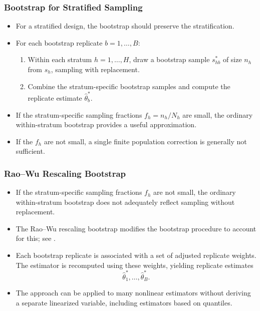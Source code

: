 \documentclass{my_eth_beamer}
\numberwithin{equation}{section}
\begin{document}
\begin{frame}
    \frametitle{\normalsize{Bootstrap for Stratified Sampling}}
    \begin{itemize}
    \setlength{\itemsep}{8pt}
        \item For a stratified design, the bootstrap should
            \alert{preserve the stratification}.
        \item For each bootstrap replicate $b=1,\ldots,B$:
            \vspace{0.25em}
            \begin{enumerate}
            \setlength{\itemsep}{5pt}
                \item Within each stratum $h = 1, \ldots, H$, draw a bootstrap
                    sample $s_{hb}^*$ of size $n_h$ from $s_h$, sampling
                    \alert{with replacement}.
                \item Combine the stratum-specific bootstrap samples and
                    compute the replicate estimate $\widehat{\theta}_b^*$.
            \end{enumerate}
        \item If the stratum-specific sampling fractions $f_h = n_h / N_h$
            are small, the ordinary within-stratum bootstrap provides a
            useful approximation.
        \item If the $f_h$ are not small, a single finite population
            correction is generally \alert{not sufficient}.
    \end{itemize}
\end{frame}

\begin{frame}
    \frametitle{\normalsize{Rao--Wu Rescaling Bootstrap}}
    \begin{itemize}
    \setlength{\itemsep}{8pt}
        \item If the stratum-specific sampling fractions $f_h$ are not small,
            the ordinary within-stratum bootstrap does not adequately reflect
            sampling without replacement.
        \item The \alert{Rao--Wu rescaling bootstrap} modifies the bootstrap
            procedure to account for this; see \citet{rao_wu_1988}.
        \item Each bootstrap replicate is associated with a set of adjusted
            \alert{replicate weights}. The estimator is recomputed using these
            weights, yielding replicate estimates
            \begin{equation*}
                \widehat{\theta}_1^*,\ldots,\widehat{\theta}_B^*.
            \end{equation*}
        \item The approach can be applied to many nonlinear estimators without
            deriving a separate linearized variable, including estimators
            based on \alert{quantiles}.
    \end{itemize}
\end{frame}
\end{document}

